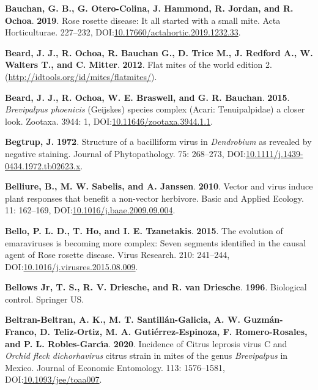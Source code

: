 \documentclass[12pt,final,CPage]{ufthesis}
\newlength{\cslhangindent}
\newenvironment{CSLReferences}[2] %
{%
	\setlength{\parindent}{0pt}
	\ifodd #1 \everypar{\setlength{\hangindent}{\cslhangindent}}\ignorespaces\fi
	\ifnum #2 > 0
	\setlength{\parskip}{#2\baselineskip}
	\fi
}%
{}
\begin{document}
{\begin{CSLReferences}{1}{0}
  \leavevmode{}%
  \textbf{Bauchan, G. B., G. Otero-Colina, J. Hammond, R. Jordan, and R. Ochoa}. \textbf{2019}. {Rose rosette disease}: It all started with a small mite. Acta Horticulturae. 227--232, DOI:\href{https://doi.org/10.17660/actahortic.2019.1232.33}{10.17660/actahortic.2019.1232.33}.

  \leavevmode{}%
  \textbf{Beard, J. J., R. Ochoa, R. Bauchan G., D. Trice M., J. Redford A., W. Walters T., and C. Mitter}. \textbf{2012}. Flat mites of the world edition 2. (\url{http://idtools.org/id/mites/flatmites/}).

  \leavevmode{}%
  \textbf{Beard, J. J., R. Ochoa, W. E. Braswell, and G. R. Bauchan}. \textbf{2015}. {\emph{Brevipalpus phoenicis}} {(Geijskes)} species complex ({Acari}: {Tenuipalpidae}) \textemdash a closer look. Zootaxa. 3944: 1, DOI:\href{https://doi.org/10.11646/zootaxa.3944.1.1}{10.11646/zootaxa.3944.1.1}.

  \leavevmode{}%
  \textbf{Begtrup, J.} \textbf{1972}. Structure of a bacilliform virus in {\emph{Dendrobium}} as revealed by negative staining. Journal of Phytopathology. 75: 268--273, DOI:\href{https://doi.org/10.1111/j.1439-0434.1972.tb02623.x}{10.1111/j.1439-0434.1972.tb02623.x}.

  \leavevmode{}%
  \textbf{Belliure, B., M. W. Sabelis, and A. Janssen}. \textbf{2010}. Vector and virus induce plant responses that benefit a non-vector herbivore. Basic and Applied Ecology. 11: 162--169, DOI:\href{https://doi.org/10.1016/j.baae.2009.09.004}{10.1016/j.baae.2009.09.004}.

  \leavevmode{}%
  \textbf{Bello, P. L. D., T. Ho, and I. E. Tzanetakis}. \textbf{2015}. The evolution of emaraviruses is becoming more complex: Seven segments identified in the causal agent of {Rose rosette disease}. Virus Research. 210: 241--244, DOI:\href{https://doi.org/10.1016/j.virusres.2015.08.009}{10.1016/j.virusres.2015.08.009}.

  \leavevmode{}%
  \textbf{Bellows Jr, T. S., R. V. Driesche, and R. van Driesche}. \textbf{1996}. Biological control. Springer US.

  \leavevmode{}%
  \textbf{Beltran-Beltran, A. K., M. T. Santillán-Galicia, A. W. Guzmán-Franco, D. Teliz-Ortiz, M. A. Gutiérrez-Espinoza, F. Romero-Rosales, and P. L. Robles-Garcı́a}. \textbf{2020}. Incidence of {Citrus leprosis virus} {C} and {\emph{Orchid fleck dichorhavirus}} citrus strain in mites of the genus {\emph{Brevipalpus}} in {Mexico}. Journal of Economic Entomology. 113: 1576--1581, DOI:\href{https://doi.org/10.1093/jee/toaa007}{10.1093/jee/toaa007}.


\end{CSLReferences}}
\end{document}

